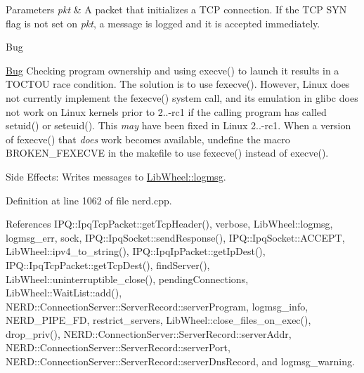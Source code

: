 \begin{DoxyParams}{\-Parameters}
{\em pkt} & \-A packet that initializes a \-T\-C\-P connection. \-If the \-T\-C\-P \-S\-Y\-N flag is not set on {\itshape pkt\/}, a message is logged and it is accepted immediately. \\
\hline
\end{DoxyParams}
\begin{DoxyRefDesc}{\-Bug}
\item[\hyperlink{bug__bug000005}{\-Bug}]\-Checking program ownership and using {\ttfamily execve()} to launch it results in a \-T\-O\-C\-T\-O\-U race condition. \-The solution is to use {\ttfamily fexecve()}. \-However, \-Linux does not currently implement the {\ttfamily fexecve()} system call, and its emulation in glibc does not work on \-Linux kernels prior to 2..-\/rc1 if the calling program has called {\ttfamily setuid()} or {\ttfamily seteuid()}. \-This {\itshape may\/} have been fixed in \-Linux 2..-\/rc1. \-When a version of {\ttfamily fexecve()} that {\itshape does\/} work becomes available, undefine the macro {\ttfamily \-B\-R\-O\-K\-E\-N\-\_\-\-F\-E\-X\-E\-C\-V\-E} in the makefile to use {\ttfamily fexecve()} instead of {\ttfamily execve()}. \end{DoxyRefDesc}
\begin{DoxyParagraph}{\-Side \-Effects\-:}
\-Writes messages to \hyperlink{namespaceLibWheel_af4ca70f4f65b2948701218436516a679}{\-Lib\-Wheel\-::logmsg}. 
\end{DoxyParagraph}


\-Definition at line 1062 of file nerd.\-cpp.



\-References \-I\-P\-Q\-::\-Ipq\-Tcp\-Packet\-::get\-Tcp\-Header(), verbose, \-Lib\-Wheel\-::logmsg, logmsg\-\_\-err, sock, \-I\-P\-Q\-::\-Ipq\-Socket\-::send\-Response(), \-I\-P\-Q\-::\-Ipq\-Socket\-::\-A\-C\-C\-E\-P\-T, \-Lib\-Wheel\-::ipv4\-\_\-to\-\_\-string(), \-I\-P\-Q\-::\-Ipq\-Ip\-Packet\-::get\-Ip\-Dest(), \-I\-P\-Q\-::\-Ipq\-Tcp\-Packet\-::get\-Tcp\-Dest(), find\-Server(), \-Lib\-Wheel\-::uninterruptible\-\_\-close(), pending\-Connections, \-Lib\-Wheel\-::\-Wait\-List\-::add(), \-N\-E\-R\-D\-::\-Connection\-Server\-::\-Server\-Record\-::server\-Program, logmsg\-\_\-info, \-N\-E\-R\-D\-\_\-\-P\-I\-P\-E\-\_\-\-F\-D, restrict\-\_\-servers, \-Lib\-Wheel\-::close\-\_\-files\-\_\-on\-\_\-exec(), drop\-\_\-priv(), \-N\-E\-R\-D\-::\-Connection\-Server\-::\-Server\-Record\-::server\-Addr, \-N\-E\-R\-D\-::\-Connection\-Server\-::\-Server\-Record\-::server\-Port, \-N\-E\-R\-D\-::\-Connection\-Server\-::\-Server\-Record\-::server\-Dns\-Record, and logmsg\-\_\-warning.



